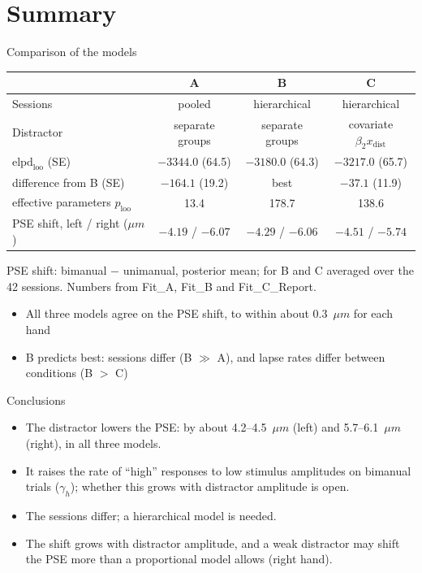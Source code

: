 \section{Summary}

\begin{frame}{Comparison of the models}
  \centering
  \begin{tabular}{lccc}
    \toprule
     & A & B & C \\
    \midrule
    Sessions & pooled & hierarchical & hierarchical \\
    Distractor & separate groups & separate groups & covariate $\beta_2 x_\text{dist}$ \\
    $\text{elpd}_\text{loo}$ (SE) & $-3344.0$ (64.5) & $-3180.0$ (64.3) & $-3217.0$ (65.7) \\
    difference from B (SE) & $-164.1$ (19.2) & best & $-37.1$ (11.9) \\
    effective parameters $p_\text{loo}$ & 13.4 & 178.7 & 138.6 \\
    PSE shift, left / right ($\mu m$) & $-4.19$ / $-6.07$ & $-4.29$ / $-6.06$ & $-4.51$ / $-5.74$ \\
    \bottomrule
  \end{tabular}

  \vspace{0.4em}
  {\scriptsize\color{muted} PSE shift: bimanual $-$ unimanual, posterior mean; for B and C averaged
  over the 42 sessions. Numbers from Fit\_A, Fit\_B and Fit\_C\_Report.}

  \vfill
  \raggedright
  \begin{itemize}
    \item All three models agree on the PSE shift, to within about 0.3~$\mu m$ for each hand
    \item B predicts best: sessions differ (B $\gg$ A), and lapse rates differ
          between conditions (B $>$ C)
  \end{itemize}
\end{frame}

\begin{frame}{Conclusions}
  \begin{itemize}
    \item The distractor lowers the PSE: by about 4.2--4.5~$\mu m$ (left) and 5.7--6.1~$\mu m$
          (right), in all three models.
    \item It raises the rate of ``high'' responses to low stimulus amplitudes on bimanual trials
          ($\gamma_h$); whether this grows with distractor amplitude is open.
    \item The sessions differ; a hierarchical model is needed.
    \item The shift grows with distractor amplitude, and a weak distractor may shift the PSE
          more than a proportional model allows (right hand).
  \end{itemize}
\end{frame}

